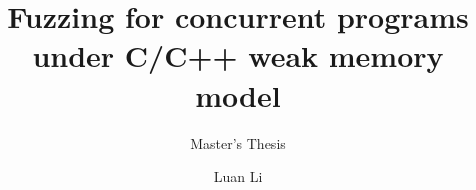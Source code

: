 \documentclass[twoside,a4paper,11pt]{memoir}
\title{Fuzzing for concurrent programs under C/C++ weak memory model}
\subtitle{Master's Thesis}
\author{Luan Li}                               %
\begin{document}
\frontmatter
\thispagestyle{empty}
\maketitle                                      %
\makeformaltitlepages{}         %



\cleardoublepage\tableofcontents
\cleardoublepage\listoffigures
\cleardoublepage\mainmatter

 
 
 
 
 

 
 






\appendix
\def\chaptername{Appendix}


\end{document}
